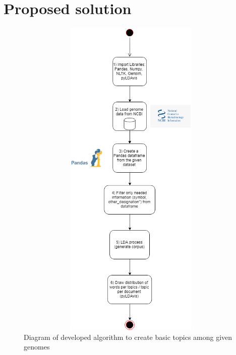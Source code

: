 \section{Proposed solution}\label{proposed_solution}

\begin{figure}[htbp]
	\centering
	\includegraphics[width=1\textwidth, height=600px, keepaspectratio]{Image/LDA_preprocess.png}
	\caption{Diagram of developed algorithm to create basic topics among given genomes}
	\label{algorithm_figure}
\end{figure}

